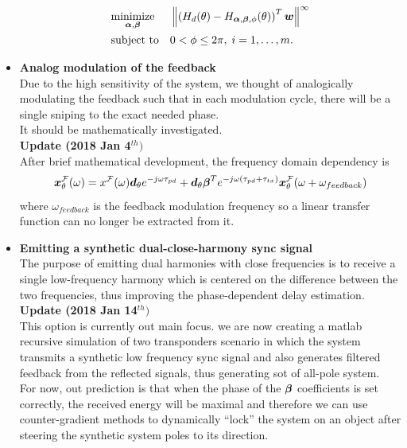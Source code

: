 \documentclass[12pt]{article}
\begin{document}
\begin{itemize}
\begin{equation*}
\begin{aligned}
& \underset{\boldsymbol{\alpha},\boldsymbol{\beta}}{\text{minimize}}
& & 
\left\lVert 
\left(H_{d}(\theta) - H_{\boldsymbol{\alpha},\boldsymbol{\beta},\phi}(\theta)\right)^{T}\boldsymbol{w}
\right\rVert^\infty
\\
& \text{subject to}
& & 0 < \phi \leq 2\pi, \; i = 1, \ldots, m.
\end{aligned}
\end{equation*}
\item {
\textbf{Analog modulation of the feedback}
\\
Due to the high sensitivity of the system, we thought of analogically modulating the feedback such that in each modulation cycle, there will be a single sniping to the exact needed phase. 
\\
It should be mathematically investigated.
\\
\textbf{Update (2018 Jan 4$^{th})$}
\\
After brief mathematical development, the frequency domain dependency is
$$
\boldsymbol{x}^{\mathcal{F}}_{\theta}(\omega) = 
x^{\mathcal{F}}(\omega)
\boldsymbol{d}_{\theta}
e^{-j\omega\tau_{pd}}
+
\boldsymbol{d}_{\theta}
\boldsymbol{\beta}^{T}
e^{-j\omega(\tau_{pd}+\tau_{tx})}
\boldsymbol{x}_{\theta}^{\mathcal{F}}(\omega+\omega_{feedback})
$$
where $ \omega_{feedback} $ is the feedback modulation frequency so a linear transfer function can no longer be extracted from it. 
}
\item {
\textbf{Emitting a synthetic dual-close-harmony sync signal}
\\
The purpose of emitting dual harmonies with close frequencies is to receive a single low-frequency harmony which is centered on the difference between the two frequencies, thus improving the phase-dependent delay estimation.
\\
\textbf{Update (2018 Jan 14$^{th})$}
\\
This option is currently out main focus. we are now creating a matlab recursive simulation of two transponders scenario in which the system transmits a synthetic low frequency sync signal and also generates filtered feedback from the reflected signals, thus generating sot of all-pole system.
\\
For now, out prediction is that when the phase of the $ \boldsymbol{\beta} $ coefficients is set correctly, the received energy will be maximal and therefore we can use counter-gradient methods to dynamically ``lock'' the system on an object after steering the synthetic system poles to its direction.
}
\end{itemize}
\end{document}
